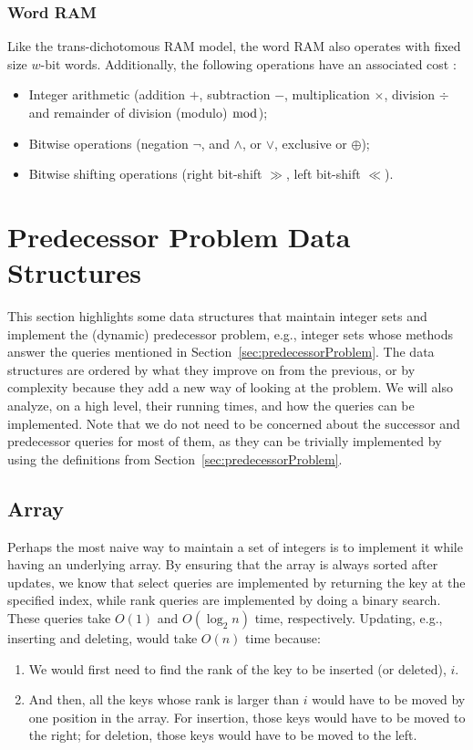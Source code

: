 \subsubsection{Word RAM} \label{sec:wordRAM}
Like the trans-dichotomous RAM model, the word RAM also operates with fixed size $w$-bit words. Additionally, the following operations have an associated cost \cite{nelsonjelanilec1}:
\begin{itemize}
    \item Integer arithmetic (addition $+$, subtraction $-$, multiplication $\times$, division $\div$ and remainder of division (modulo) $\bmod$);
    \item Bitwise operations (negation $\neg$, and $\wedge$, or $\vee$, exclusive or $\oplus$);
    \item Bitwise shifting operations (right bit-shift $\gg$, left bit-shift $\ll$).
\end{itemize}

\newpage
\section{Predecessor Problem Data Structures} \label{sec:IntegerSets}

This section highlights some data structures that maintain integer sets and implement the (dynamic) predecessor problem, e.g., integer sets whose methods answer the queries mentioned in Section~\ref{sec:predecessorProblem}.
The data structures are ordered by what they improve on from the previous, or by complexity because they add a new way of looking at the problem.
We will also analyze, on a high level, their running times, and how the queries can be implemented.
Note that we do not need to be concerned about the successor and predecessor queries for most of them, as they can be trivially implemented by using the definitions from Section~\ref{sec:predecessorProblem}.

\subsection{Array} \label{sec:array}

Perhaps the most naive way to maintain a set of integers is to implement it while having an underlying array. By ensuring that the array is always sorted after updates, we know that select queries are implemented by returning the key at the specified index, while rank queries are implemented by doing a binary search. These queries take $O(1)$ and $O(\log_2 n)$ time, respectively. Updating, e.g., inserting and deleting, would take $O(n)$ time because:
\begin{enumerate}
    \item
    We would first need to find the rank of the key to be inserted (or deleted), $i$.
    
    \item
    And then, all the keys whose rank is larger than $i$ would have to be moved by one position in the array. For insertion, those keys would have to be moved to the right; for deletion, those keys would have to be moved to the left.
\end{enumerate}

